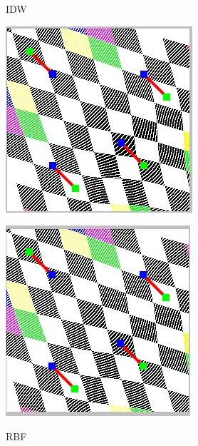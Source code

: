\documentclass{article}
\begin{document}
	\clearpage
	\begin{figure}[htbp]
		\centering
		\begin{minipage}{0.4\linewidth}
			\centering
			\caption{IDW}
			\includegraphics[width=1\linewidth]{IDW3.jpg}
			\label{chutian1}
		\end{minipage}
		\begin{minipage}{0.4\linewidth}
			\centering
			\caption{RBF}
			\includegraphics[width=1\linewidth]{RBF3.jpg}
			\label{chutian2}
		\end{minipage}
	\end{figure}
	
\end{document}

